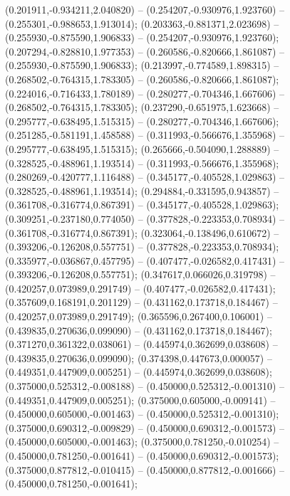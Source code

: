  (0.201911,-0.934211,2.040820) -- (0.254207,-0.930976,1.923760) -- (0.255301,-0.988653,1.913014);
 (0.203363,-0.881371,2.023698) -- (0.255930,-0.875590,1.906833) -- (0.254207,-0.930976,1.923760);
 (0.207294,-0.828810,1.977353) -- (0.260586,-0.820666,1.861087) -- (0.255930,-0.875590,1.906833);
 (0.213997,-0.774589,1.898315) -- (0.268502,-0.764315,1.783305) -- (0.260586,-0.820666,1.861087);
 (0.224016,-0.716433,1.780189) -- (0.280277,-0.704346,1.667606) -- (0.268502,-0.764315,1.783305);
 (0.237290,-0.651975,1.623668) -- (0.295777,-0.638495,1.515315) -- (0.280277,-0.704346,1.667606);
 (0.251285,-0.581191,1.458588) -- (0.311993,-0.566676,1.355968) -- (0.295777,-0.638495,1.515315);
 (0.265666,-0.504090,1.288889) -- (0.328525,-0.488961,1.193514) -- (0.311993,-0.566676,1.355968);
 (0.280269,-0.420777,1.116488) -- (0.345177,-0.405528,1.029863) -- (0.328525,-0.488961,1.193514);
 (0.294884,-0.331595,0.943857) -- (0.361708,-0.316774,0.867391) -- (0.345177,-0.405528,1.029863);
 (0.309251,-0.237180,0.774050) -- (0.377828,-0.223353,0.708934) -- (0.361708,-0.316774,0.867391);
 (0.323064,-0.138496,0.610672) -- (0.393206,-0.126208,0.557751) -- (0.377828,-0.223353,0.708934);
 (0.335977,-0.036867,0.457795) -- (0.407477,-0.026582,0.417431) -- (0.393206,-0.126208,0.557751);
 (0.347617,0.066026,0.319798) -- (0.420257,0.073989,0.291749) -- (0.407477,-0.026582,0.417431);
 (0.357609,0.168191,0.201129) -- (0.431162,0.173718,0.184467) -- (0.420257,0.073989,0.291749);
 (0.365596,0.267400,0.106001) -- (0.439835,0.270636,0.099090) -- (0.431162,0.173718,0.184467);
 (0.371270,0.361322,0.038061) -- (0.445974,0.362699,0.038608) -- (0.439835,0.270636,0.099090);
 (0.374398,0.447673,0.000057) -- (0.449351,0.447909,0.005251) -- (0.445974,0.362699,0.038608);
 (0.375000,0.525312,-0.008188) -- (0.450000,0.525312,-0.001310) -- (0.449351,0.447909,0.005251);
 (0.375000,0.605000,-0.009141) -- (0.450000,0.605000,-0.001463) -- (0.450000,0.525312,-0.001310);
 (0.375000,0.690312,-0.009829) -- (0.450000,0.690312,-0.001573) -- (0.450000,0.605000,-0.001463);
 (0.375000,0.781250,-0.010254) -- (0.450000,0.781250,-0.001641) -- (0.450000,0.690312,-0.001573);
 (0.375000,0.877812,-0.010415) -- (0.450000,0.877812,-0.001666) -- (0.450000,0.781250,-0.001641);
